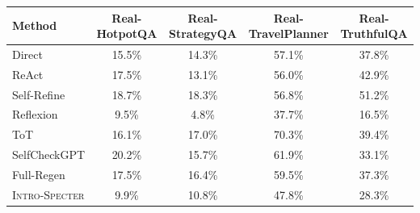 \begin{tabular}{lcccc}
\toprule
Method & Real-HotpotQA & Real-StrategyQA & Real-TravelPlanner & Real-TruthfulQA \\
\midrule
Direct & 15.5\% & 14.3\% & 57.1\% & 37.8\% \\
ReAct & 17.5\% & 13.1\% & 56.0\% & 42.9\% \\
Self-Refine & 18.7\% & 18.3\% & 56.8\% & 51.2\% \\
Reflexion & 9.5\% & 4.8\% & 37.7\% & 16.5\% \\
ToT & 16.1\% & 17.0\% & 70.3\% & 39.4\% \\
SelfCheckGPT & 20.2\% & 15.7\% & 61.9\% & 33.1\% \\
Full-Regen & 17.5\% & 16.4\% & 59.5\% & 37.3\% \\
\textsc{Intro-Specter} & 9.9\% & 10.8\% & 47.8\% & 28.3\% \\
\bottomrule
\end{tabular}